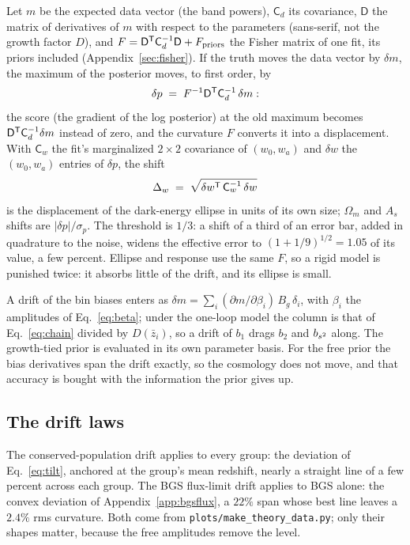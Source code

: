 Let $m$ be the expected data vector (the band powers), $\mathsf{C}_d$
its covariance, $\mathsf{D}$ the matrix of derivatives of $m$ with
respect to the parameters (sans-serif, not the growth factor $D$), and
$F = \mathsf{D}^{\mathsf{T}} \mathsf{C}_d^{-1} \mathsf{D} + F_{\rm priors}$ the
Fisher matrix of one fit, its priors included (Appendix~\ref{sec:fisher}).
If the truth moves the data vector by $\delta m$, the maximum of the
posterior moves, to first order, by
\begin{equation}
  \delta p \;=\; F^{-1} \mathsf{D}^{\mathsf{T}} \mathsf{C}_d^{-1}\, \delta m :
  \label{eq:fisherbias}
\end{equation}
the score (the gradient of the log posterior) at the old maximum
becomes $\mathsf{D}^{\mathsf{T}} \mathsf{C}_d^{-1} \delta m$ instead of zero, and
the curvature $F$ converts it into a displacement.  With
$\mathsf{C}_w$ the fit's marginalized $2 \times 2$ covariance of
$(w_0, w_a)$ and $\delta w$ the $(w_0, w_a)$ entries of $\delta p$,
the shift
\begin{equation}
  \Delta_w \;=\; \sqrt{\delta w^{\mathsf{T}}\, \mathsf{C}_w^{-1}\, \delta w}
  \label{eq:shiftw}
\end{equation}
is the displacement of the dark-energy ellipse in units of its own
size; $\Omega_m$ and $A_s$ shifts are $|\delta p|/\sigma_p$.  The
threshold is $1/3$: a shift of a third of an error bar, added in
quadrature to the noise, widens the effective error to
$(1 + 1/9)^{1/2} = 1.05$ of its value, a few percent.  Ellipse and response use the same $F$, so a rigid model is
punished twice: it absorbs little of the drift, and its ellipse is
small.

A drift of the bin biases enters as
$\delta m = \sum_i (\partial m / \partial \beta_i)\, B_g\, \delta_i$,
with $\beta_i$ the amplitudes of Eq.~\eqref{eq:beta}; under the
one-loop model
the column is that of Eq.~\eqref{eq:chain} divided by $D(\bar{z}_i)$,
so a drift of $b_1$ drags $b_2$ and $b_{s^2}$ along.  The growth-tied
prior is evaluated in its own parameter basis.  For the free prior the
bias derivatives span the drift exactly, so the cosmology does not
move, and that accuracy is bought with the information the prior gives
up.

\subsection{The drift laws}
\label{sec:driftlaws}

The conserved-population drift applies to every group: the deviation
of Eq.~\eqref{eq:tilt}, anchored at the group's mean redshift, nearly
a straight line of a few percent across each group.  The BGS
flux-limit drift applies to BGS alone: the convex deviation of
Appendix~\ref{app:bgsflux}, a $22\%$ span whose best line leaves a
$2.4\%$ rms curvature.  Both come from
\texttt{plots/make\_theory\_data.py}; only their shapes matter, because
the free amplitudes remove the level.


